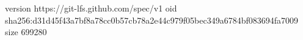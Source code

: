 version https://git-lfs.github.com/spec/v1
oid sha256:d31d45f43a7bf8a78cc0b57cb78a2e44c979f05bec349a6784bf083694fa7009
size 699280
